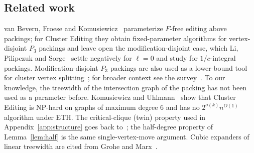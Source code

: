 \subsection{Related work}\label{sec:related}
van Bevern, Froese and Komusiewicz~\cite{BFK18} parameterize $F$-free editing above packings; for Cluster Editing they obtain fixed-parameter algorithms for vertex-disjoint $P_3$ packings and leave open the modification-disjoint case, which Li, Pilipczuk and Sorge~\cite{LPS23} settle negatively for $\ell=0$ and study for $1/c$-integral packings. Modification-disjoint $P_3$ packings are also used as a lower-bound tool for cluster vertex splitting~\cite{Split24}; for broader context see the survey~\cite{Crespelle23}. To our knowledge, the treewidth of the intersection graph of the packing has not been used as a parameter before. Komusiewicz and Uhlmann~\cite{KU12} show that Cluster Editing is NP-hard on graphs of maximum degree $6$ and has no $2^{o(k)}n^{O(1)}$ algorithm under ETH. The critical-clique (twin) property used in Appendix~\ref{app:structure} goes back to~\cite{Guo09,FLRS07}; the half-degree property of Lemma~\ref{lem:half} is the same single-vertex-move argument. Cubic expanders of linear treewidth are cited from Grohe and Marx~\cite{GM09}.

